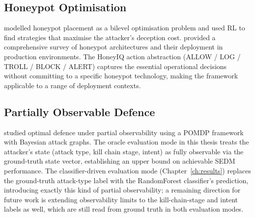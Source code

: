 \subsection{Honeypot Optimisation}

\citet{shi2021learning} modelled honeypot placement as a bilevel optimisation
problem and used RL to find strategies that maximise the attacker's deception
cost.
\citet{franco2021survey} provided a comprehensive survey of honeypot
architectures and their deployment in production environments.
The HoneyIQ action abstraction (ALLOW / LOG / TROLL / BLOCK / ALERT) captures
the essential operational decisions without committing to a specific honeypot
technology, making the framework applicable to a range of deployment contexts.

\subsection{Partially Observable Defence}

\citet{miehling2018optimal} studied optimal defence under partial observability
using a POMDP framework with Bayesian attack graphs.
The oracle evaluation mode in this thesis treats the attacker's state
(attack type, kill chain stage, intent) as fully observable via the
ground-truth state vector, establishing an upper bound on achievable SEDM
performance. The classifier-driven evaluation mode (Chapter~\ref{ch:results})
replaces the ground-truth attack-type label with the RandomForest
classifier's prediction, introducing exactly this kind of partial
observability; a remaining direction for future work is extending
observability limits to the kill-chain-stage and intent labels as well,
which are still read from ground truth in both evaluation modes.
